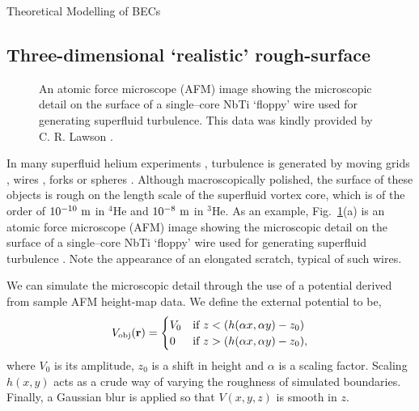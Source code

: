 \begin{chapter}{\label{cha:theoretical_model}Theoretical Modelling of BECs}
\subsection{\label{section:3dafmpotential} Three-dimensional `realistic' rough-surface}
\begin{figure}
	\centering
  \caption{An atomic force microscope (AFM) image showing the microscopic detail on the surface of a  single--core NbTi `floppy' wire used for generating superfluid turbulence. This data was kindly provided by C. R. Lawson \cite{Lawson}.}\label{fig_afmprofile}
 \end{figure}

In many superfluid helium experiments \cite{VinenSkrbek2008}, turbulence
is generated by moving grids \cite{Davis2000},
wires \cite{Guenault1986,brad05,Bradley2011,Fisher2001,goto08},
forks \cite{Blaauwgeers2007,Bradley2012} or spheres \cite{Schoepe1995}.
Although macroscopically polished, the surface of these objects is
rough on the length scale of the superfluid vortex core, which is of
the order of $10^{-10}~\rm m$ in $^4$He
and $10^{-8}~\rm m$ in $^3$He.  As an example, Fig.~\ref{fig_afmprofile}(a) is an atomic force microscope (AFM) image showing the microscopic detail on the surface of a  single--core NbTi `floppy' wire used for generating superfluid turbulence  \cite{Bradley2011}.  Note the appearance of an elongated scratch, typical of such wires.

We can simulate the microscopic detail through the use of a potential derived from sample AFM height-map data. We define the external potential to be,
\begin{equation}
V_{\mathrm{obj}}({\bf r}) =
\begin{cases}
V_0 &\mbox{if } z < (h(\alpha x,\alpha y)-z_0)  \\
0 &\mbox{if } z > (h(\alpha x,\alpha y)-z_0),
\end{cases}
\label{eq:potentialAFM3D}
\end{equation}
where $V_0$ is its amplitude, $z_0$ is a shift in height and $\alpha$ is a scaling factor. Scaling $h(x,y)$ acts as a crude way of varying 
the roughness of simulated boundaries. Finally, a Gaussian blur is applied so that $V(x,y,z)$ is smooth in $z$.

\end{chapter}

